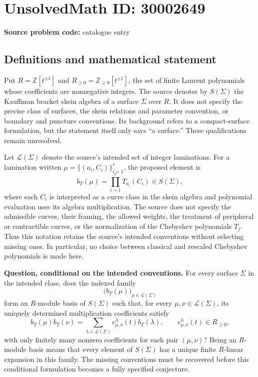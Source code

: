 \documentclass[11pt]{article}
\newcommand{\Z}{\mathbb{Z}}
\begin{document}
\section*{UnsolvedMath ID: 30002649}
\textbf{Source problem code:} catalogue entry
\subsection{Definitions and mathematical statement}
Put \(R=\Z[t^{\pm1}]\) and \(R_{\geq0}=\Z_{\geq0}[t^{\pm1}]\), the set of finite Laurent polynomials whose coefficients are nonnegative integers. The source denotes by \(S(\Sigma)\) the Kauffman bracket skein algebra of a surface \(\Sigma\) over \(R\). It does not specify the precise class of surfaces, the skein relations and parameter convention, or boundary and puncture conventions. Its background refers to a compact-surface formulation, but the statement itself only says ``a surface.'' These qualifications remain unresolved.

Let \(\mathcal L(\Sigma)\) denote the source's intended set of integer laminations. For a lamination written \(\mu=\{(a_i,C_i)\}_{i=1}^{r}\), the proposed element is
\[
 b_T(\mu)=\prod_{i=1}^{r}T_{a_i}(C_i)\in S(\Sigma),
\]
where each \(C_i\) is interpreted as a curve class in the skein algebra and polynomial evaluation uses its algebra multiplication. The source does not specify the admissible curves, their framing, the allowed weights, the treatment of peripheral or contractible curves, or the normalization of the Chebyshev polynomials \(T_j\). Thus this notation retains the source's intended conventions without selecting missing ones. In particular, no choice between classical and rescaled Chebyshev polynomials is made here.

\textbf{Question, conditional on the intended conventions.} For every surface \(\Sigma\) in the intended class, does the indexed family
\[
 \bigl(b_T(\mu)\bigr)_{\mu\in\mathcal L(\Sigma)}
\]
form an \(R\)-module basis of \(S(\Sigma)\) such that, for every \(\mu,\nu\in\mathcal L(\Sigma)\), its uniquely determined multiplication coefficients satisfy
\[
 b_T(\mu)b_T(\nu)
 =\sum_{\lambda\in\mathcal L(\Sigma)}
 c_{\mu,\nu}^{\lambda}(t)b_T(\lambda),
 \qquad
 c_{\mu,\nu}^{\lambda}(t)\in R_{\geq0},
\]
with only finitely many nonzero coefficients for each pair \((\mu,\nu)\)? Being an \(R\)-module basis means that every element of \(S(\Sigma)\) has a unique finite \(R\)-linear expansion in this family. The missing conventions must be recovered before this conditional formulation becomes a fully specified conjecture.
\end{document}
